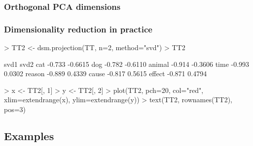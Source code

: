 \documentclass[t]{beamer} %
\begin{document}
\begin{frame}[c]
  \frametitle{Orthogonal PCA dimensions}

  \begin{center}
  \end{center}
\end{frame}

\begin{frame}[fragile]
  \frametitle{Dimensionality reduction in practice}

\ungap[1.5]
\begin{Rcode}
> TT2 <- dsm.projection(TT, n=2, method="svd")
> TT2\begin{Rout}
         svd1    svd2
cat    -0.733 -0.6615
dog    -0.782 -0.6110
animal -0.914 -0.3606
time   -0.993  0.0302
reason -0.889  0.4339
cause  -0.817  0.5615
effect -0.871  0.4794
\end{Rout}
> x <- TT2[, 1] 
> y <- TT2[, 2] 
> plot(TT2, pch=20, col="red", 
       xlim=extendrange(x), ylim=extendrange(y))
> text(TT2, rownames(TT2), pos=3)    
\end{Rcode}
  
\end{frame}


\subsection{Examples}
\end{document}
